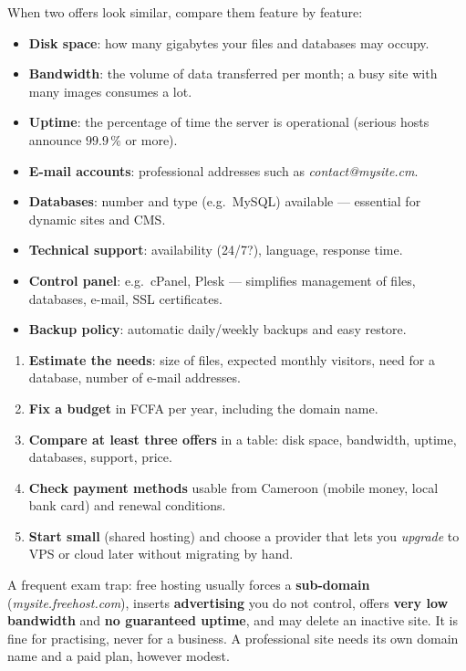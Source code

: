 \documentclass[11pt]{article}
\newcounter{popsec}
\newcounter{popsub}
\newcommand{\courssub}[1]{%
  \stepcounter{popsub}%
  \par\vspace{9pt}\noindent{\popxbold\fontsize{11.5}{13}\selectfont\color{popink}{\color{poporange}\thepopsec.\thepopsub}\hspace{6pt}#1}\par\nopagebreak\vspace{4pt}
}
\begin{document}
\courssub{Key Hosting Features to Compare}

When two offers look similar, compare them feature by feature:

\begin{itemize}
\item \textbf{Disk space}: how many gigabytes your files and databases may occupy.
\item \textbf{Bandwidth}: the volume of data transferred per month; a busy site with many images consumes a lot.
\item \textbf{Uptime}: the percentage of time the server is operational (serious hosts announce $99.9\,\%$ or more).
\item \textbf{E-mail accounts}: professional addresses such as \emph{contact@mysite.cm}.
\item \textbf{Databases}: number and type (e.g.\ MySQL) available --- essential for dynamic sites and CMS.
\item \textbf{Technical support}: availability (24/7?), language, response time.
\item \textbf{Control panel}: e.g.\ cPanel, Plesk --- simplifies management of files, databases, e-mail, SSL certificates.
\item \textbf{Backup policy}: automatic daily/weekly backups and easy restore.
\end{itemize}

\begin{methode}
\begin{enumerate}
\item \textbf{Estimate the needs}: size of files, expected monthly visitors, need for a database, number of e-mail addresses.
\item \textbf{Fix a budget} in FCFA per year, including the domain name.
\item \textbf{Compare at least three offers} in a table: disk space, bandwidth, uptime, databases, support, price.
\item \textbf{Check payment methods} usable from Cameroon (mobile money, local bank card) and renewal conditions.
\item \textbf{Start small} (shared hosting) and choose a provider that lets you \emph{upgrade} to VPS or cloud later without migrating by hand.
\end{enumerate}
\end{methode}

\begin{attention}
A frequent exam trap: free hosting usually forces a \textbf{sub-domain} (\emph{mysite.freehost.com}), inserts \textbf{advertising} you do not control, offers \textbf{very low bandwidth} and \textbf{no guaranteed uptime}, and may delete an inactive site. It is fine for practising, never for a business. A professional site needs its own domain name and a paid plan, however modest.
\end{attention}
\end{document}
